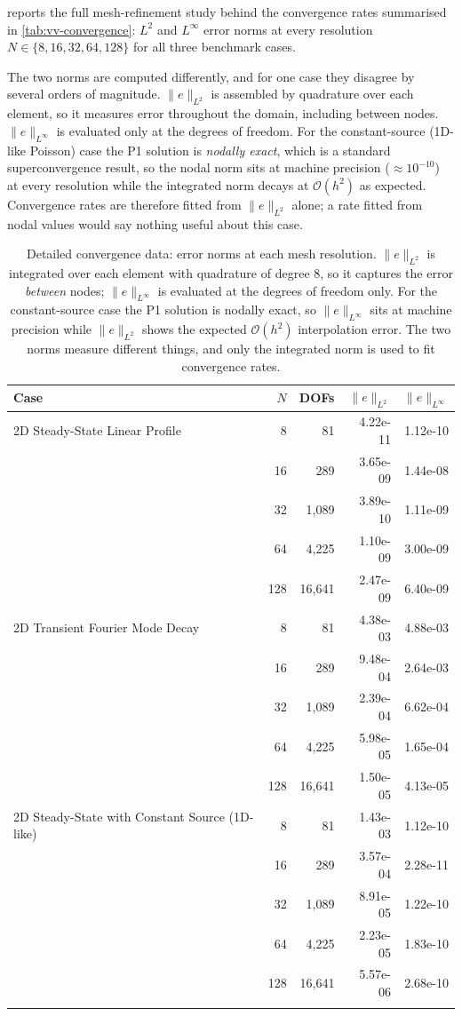 \documentclass[preprint,review,12pt]{elsarticle}
\newif\ifrevisionsvisible
\newcommand{\revised}[1]{%
  \ifrevisionsvisible\textcolor{revisionred}{#1}\else#1\fi}
\begin{document}
\revised{ reports the full mesh-refinement study behind the
convergence rates summarised in \cref{tab:vv-convergence}: $L^2$ and
$L^\infty$ error norms at every resolution $N \in \{8, 16, 32, 64, 128\}$
for all three benchmark cases.}

\revised{The two norms are computed differently, and for one case they disagree
by several orders of magnitude.  $\|e\|_{L^2}$ is assembled by quadrature
over each element, so it measures error throughout the domain, including
between nodes.  $\|e\|_{L^\infty}$ is evaluated only at the degrees of
freedom.  For the constant-source (1D-like Poisson) case the P1 solution
is \emph{nodally exact}, which is a standard superconvergence result, so
the nodal norm sits at machine precision ($\approx 10^{-10}$) at every
resolution while the integrated norm decays at $\mathcal{O}(h^2)$ as
expected.  Convergence rates are therefore fitted from $\|e\|_{L^2}$
alone; a rate fitted from nodal values would say nothing useful about
this case.}

\begin{table}[htbp]
\centering\footnotesize
\caption{Detailed convergence data: error norms at each mesh resolution.  $\|e\|_{L^2}$ is integrated over each element with quadrature of degree 8, so it captures the error \emph{between} nodes; $\|e\|_{L^\infty}$ is evaluated at the degrees of freedom only.  For the constant-source case the P1 solution is nodally exact, so $\|e\|_{L^\infty}$ sits at machine precision while $\|e\|_{L^2}$ shows the expected $\mathcal{O}(h^2)$ interpolation error.  The two norms measure different things, and only the integrated norm is used to fit convergence rates.}
\label{tab:vv-detail}
\begin{tabular}{lrrrr}
\toprule
Case & $N$ & DOFs & $\|e\|_{L^2}$ & $\|e\|_{L^\infty}$ \\
\midrule
  2D Steady-State Linear Profile & 8 & 81 & 4.22e-11 & 1.12e-10 \\
   & 16 & 289 & 3.65e-09 & 1.44e-08 \\
   & 32 & 1,089 & 3.89e-10 & 1.11e-09 \\
   & 64 & 4,225 & 1.10e-09 & 3.00e-09 \\
   & 128 & 16,641 & 2.47e-09 & 6.40e-09 \\
\addlinespace
  2D Transient Fourier Mode Decay & 8 & 81 & 4.38e-03 & 4.88e-03 \\
   & 16 & 289 & 9.48e-04 & 2.64e-03 \\
   & 32 & 1,089 & 2.39e-04 & 6.62e-04 \\
   & 64 & 4,225 & 5.98e-05 & 1.65e-04 \\
   & 128 & 16,641 & 1.50e-05 & 4.13e-05 \\
\addlinespace
  2D Steady-State with Constant Source (1D-like) & 8 & 81 & 1.43e-03 & 1.12e-10 \\
   & 16 & 289 & 3.57e-04 & 2.28e-11 \\
   & 32 & 1,089 & 8.91e-05 & 1.22e-10 \\
   & 64 & 4,225 & 2.23e-05 & 1.83e-10 \\
   & 128 & 16,641 & 5.57e-06 & 2.68e-10 \\
\addlinespace
\bottomrule
\end{tabular}
\end{table}
\end{document}
